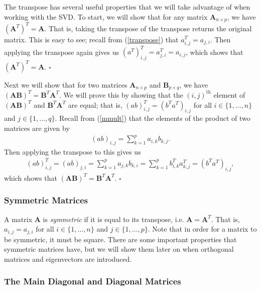 \documentclass[10pt]{article}
\newcommand{\done}{\hfill $\square$}
\newcommand{\mydef}[1]{\textcolor{SteelBlue3}{\textit{#1}}} %
\begin{document}
The transpose has several useful properties that we will take advantage of when working with the SVD. To start, we will show that for any matrix $\mathbf{A}_{n \times p}$, we have $(\mathbf{A}^T)^T = \mathbf{A}$. That is, taking the transpose of the transpose returns the original matrix. This is easy to see; recall from (\ref{transpose}) that $a^T_{i,j} = a_{j,i}$. Then applying the transpose again gives us $(a^T)^T_{i,j} = a^T_{j,i} = a_{i,j}$, which shows that $(\mathbf{A}^T)^T = \mathbf{A}$. \done

Next we will show that for two matrices $\mathbf{A}_{n \times p}$ and $\mathbf{B}_{p \times q}$, we have $(\mathbf{AB})^T = \mathbf{B}^T \mathbf{A}^T$. We will prove this by showing that the $(i,j)^{\text{th}}$ element of $(\mathbf{AB})^T$ and $\mathbf{B}^T \mathbf{A}^T$ are equal; that is, $(ab)^T_{i,j} = (b^T a^T)_{i,j}$ for all $i \in \{ 1,\ldots,n \}$ and $j \in \{ 1,\ldots,q \}$.
Recall from (\ref{mmult}) that the elements of the product of two matrices are given by 
\begin{align*}
    (ab)_{i,j} = \sum_{k=1}^p a_{i,k} b_{k,j}.
\end{align*}
Then applying the transpose to this gives us 
\begin{align*}
    (ab)^T_{i,j} = (ab)_{j,i} = \sum_{k=1}^p a_{j,k} b_{k,i} = \sum_{k=1}^p b^T_{i,k} a^T_{k,j} = (b^T a^T)_{i,j},
\end{align*}
which shows that $(\mathbf{AB})^T = \mathbf{B}^T \mathbf{A}^T$. \done 

\subsubsection{Symmetric Matrices}

A matrix $\mathbf{A}$ is \mydef{symmetric} if it is equal to its transpose, i.e. $\mathbf{A} = \mathbf{A}^T$. That is, $a_{i,j} = a_{j,i}$ for all $i \in \{ 1, \ldots, n\}$ and $j \in \{ 1,\ldots,p \}$. Note that in order for a matrix to be symmetric, it must be square. There are some important properties that symmetric matrices have, but we will show them later on when orthogonal matrices and eigenvectors are introduced. 

\subsubsection{The Main Diagonal and Diagonal Matrices}
\end{document}
